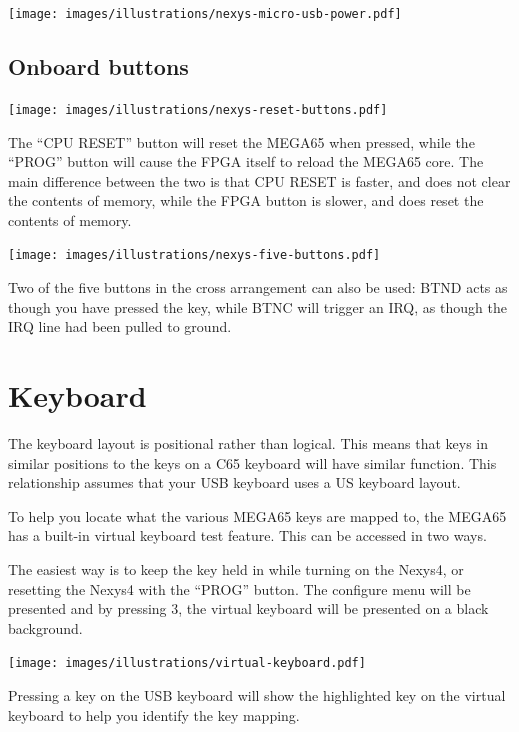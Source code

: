\texttt{[image: images/illustrations/nexys-micro-usb-power.pdf]}

\subsection{Onboard buttons}

\begin{center}
  \texttt{[image: images/illustrations/nexys-reset-buttons.pdf]}
\end{center}

The ``CPU RESET'' button will reset the MEGA65 when pressed, while the ``PROG'' button will cause the FPGA itself to reload the MEGA65
core.  The main difference between the two is that CPU RESET is faster, and does not clear the contents of memory, while the FPGA button
is slower, and does reset the contents of memory.

\begin{center}
  \texttt{[image: images/illustrations/nexys-five-buttons.pdf]}
\end{center}

Two of the five buttons in the cross arrangement can also be used:  BTND acts as though you have pressed the  key, while BTNC will trigger an IRQ, as though the IRQ line had been pulled to ground.

\section{Keyboard}

The keyboard layout is positional rather than logical.
This means that keys in similar positions to the keys on a C65 keyboard will have similar function.
This relationship assumes that your USB keyboard uses a US keyboard layout.

To help you locate what the various MEGA65 keys are mapped to, the MEGA65 has a built-in virtual keyboard test feature. This can be accessed in two ways.

The easiest way is to keep the  key held in while turning on the Nexys4, or resetting the Nexys4 with the ``PROG'' button. The configure menu will be presented and by pressing 3, the virtual keyboard will be presented on a black background.

\texttt{[image: images/illustrations/virtual-keyboard.pdf]}

Pressing a key on the USB keyboard will show the highlighted key on the virtual keyboard to help you identify the key mapping.

